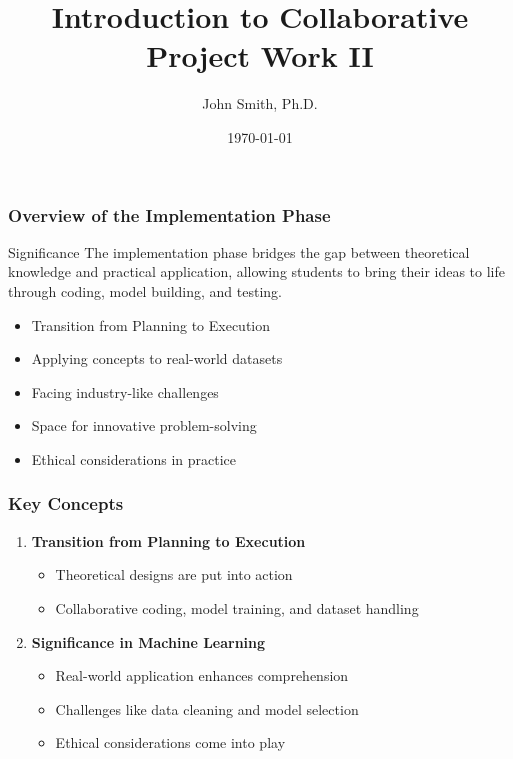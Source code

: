 \documentclass[aspectratio=169]{beamer}
\begin{document}
\frame{\titlepage}

\begin{frame}[fragile]
  \title{Introduction to Collaborative Project Work II}
  \author{John Smith, Ph.D.}
  \date{\today}
  \maketitle
\end{frame}

\begin{frame}[fragile]
  \frametitle{Overview of the Implementation Phase}
  
  \begin{block}{Significance}
    The implementation phase bridges the gap between theoretical knowledge and practical application, allowing students to bring their ideas to life through coding, model building, and testing.
  \end{block}
  
  \begin{itemize}
    \item Transition from Planning to Execution
    \item Applying concepts to real-world datasets
    \item Facing industry-like challenges
    \item Space for innovative problem-solving
    \item Ethical considerations in practice
  \end{itemize}
  
\end{frame}

\begin{frame}[fragile]
  \frametitle{Key Concepts}

  \begin{enumerate}
    \item \textbf{Transition from Planning to Execution}
      \begin{itemize}
        \item Theoretical designs are put into action
        \item Collaborative coding, model training, and dataset handling
      \end{itemize}
      
    \item \textbf{Significance in Machine Learning}
      \begin{itemize}
        \item Real-world application enhances comprehension
        \item Challenges like data cleaning and model selection
        \item Ethical considerations come into play
      \end{itemize}
  \end{enumerate}

\end{frame}
\end{document}
